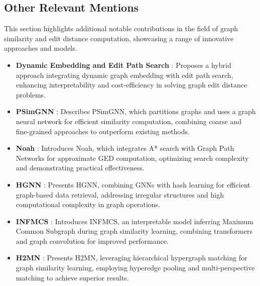 \documentclass[../Thesis.tex]{subfiles}
\begin{document}
	\subsection{Other Relevant Mentions}
	
	This section highlights additional notable contributions in the field of graph similarity and edit distance computation, showcasing a range of innovative approaches and models.
	
	\begin{itemize}
		\item \textbf{Dynamic Embedding and Edit Path Search} \cite{combinatorial_learning_of_graph_edit_distance_via_dynamic_embedding}: Proposes a hybrid approach integrating dynamic graph embedding with edit path search, enhancing interpretability and cost-efficiency in solving graph edit distance problems.
		
		\item \textbf{PSimGNN} \cite{graph_partitioning_and_graph_neural_network_based_hierarchical_graph_matching_for_graph_similarity_computation}: Describes PSimGNN, which partitions graphs and uses a graph neural network for efficient similarity computation, combining coarse and fine-grained approaches to outperform existing methods.
		
		\item \textbf{Noah} \cite{noah__neural_optimized_a*_search_algorithm_for_graph_edit_distance_computation}: Introduces Noah, which integrates A* search with Graph Path Networks for approximate GED computation, optimizing search complexity and demonstrating practical effectiveness.
		
		\item \textbf{HGNN} \cite{learning_efficient_hash_codes_for_fast_graph_based_data_similarity_retrieval}: Presents HGNN, combining GNNs with hash learning for efficient graph-based data retrieval, addressing irregular structures and high computational complexity in graph operations.
		
		\item \textbf{INFMCS} \cite{more_interpretable_graph_similarity_computation_via_maximum_common_subgraph_inference}: Introduces INFMCS, an interpretable model inferring Maximum Common Subgraph during graph similarity learning, combining transformers and graph convolution for improved performance.
		
		\item \textbf{H2MN} \cite{h2mn__graph_similarity_learning_with_hierarchical_hypergraph_matching_networks}: Presents H2MN, leveraging hierarchical hypergraph matching for graph similarity learning, employing hyperedge pooling and multi-perspective matching to achieve superior results.
		

\end{itemize}
\end{document}
